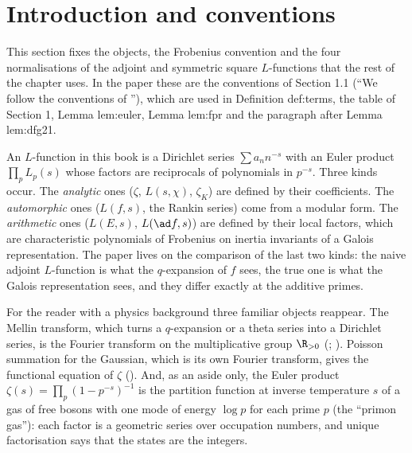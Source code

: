 \section{Introduction and conventions}\label{sec:lfunctions:intro}

This section fixes the objects, the Frobenius convention and the four normalisations of the adjoint and symmetric square $L$-functions that
the rest of the chapter uses. In the paper these are the conventions of Section 1.1 (``We follow the conventions of \cite[\S1.7.2]{DFG04}''),
which are used in Definition def:terms, the table of Section 1, Lemma lem:euler, Lemma lem:fpr and the paragraph after Lemma lem:dfg21.

An $L$-function in this book is a Dirichlet series $\sum a_nn^{-s}$ with an Euler product $\prod_pL_p(s)$ whose factors are reciprocals of polynomials in
$p^{-s}$. Three kinds occur. The \emph{analytic} ones ($\zeta$, $L(s,\chi)$, $\zeta_K$) are defined by their coefficients. The \emph{automorphic} ones
($L(f,s)$, the Rankin series) come from a modular form. The \emph{arithmetic} ones ($L(E,s)$, $L(\ad f,s)$) are defined by their local factors, which
are characteristic polynomials of Frobenius on inertia invariants of a Galois representation. The paper lives on the comparison of the last two kinds:
the naive adjoint $L$-function is what the $q$-expansion of $f$ sees, the true one is what the Galois representation sees, and they differ exactly at
the additive primes.

For the reader with a physics background three familiar objects reappear. The Mellin transform, which turns a $q$-expansion or a theta series into a
Dirichlet series, is the Fourier transform on the multiplicative group $\R_{>0}$ (\cite[Chapter 13]{RHB06}; ). Poisson summation
for the Gaussian, which is its own Fourier transform, gives the functional equation of $\zeta$ (). And, as an aside only, the Euler
product $\zeta(s)=\prod_p(1-p^{-s})^{-1}$ is the partition function at inverse temperature $s$ of a gas of free bosons with one mode of energy $\log p$ for each
prime $p$ (the ``primon gas''): each factor is a geometric series over occupation numbers, and unique factorisation says that the states are the integers.


